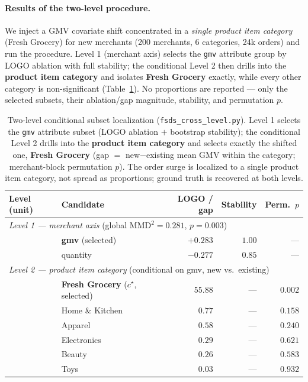 \documentclass[11pt]{article}
\newcommand{\MMD}{\mathrm{MMD}}
\begin{document}
\paragraph{Results of the two-level procedure.} We inject a GMV covariate shift
concentrated in a \emph{single product item category} (Fresh Grocery) for new
merchants (200 merchants, 6 categories, 24k orders) and run the procedure.
Level 1 (merchant axis) selects the \texttt{gmv} attribute group by LOGO ablation
with full stability; the conditional Level 2 then drills into the
\textbf{product item category} and isolates \textbf{Fresh Grocery} exactly, while
every other category is non-significant (Table~\ref{tab:twolevel}). No
proportions are reported --- only the selected subsets, their ablation/gap
magnitude, stability, and permutation $p$.

\begin{table}[t]
\centering
\begin{tabular}{llrrr}
\toprule
Level (unit) & Candidate & LOGO / gap & Stability & Perm.\ $p$ \\
\midrule
\multicolumn{5}{l}{\emph{Level 1 --- merchant axis} \;(global $\MMD^2=0.281$, $p=0.003$)}\\
\;\; & \textbf{gmv} \;(selected) & $+0.283$ & $1.00$ & --- \\
\;\; & quantity & $-0.277$ & $0.85$ & --- \\
\midrule
\multicolumn{5}{l}{\emph{Level 2 --- product item category} \;(conditional on gmv, new vs.\ existing)}\\
\;\; & \textbf{Fresh Grocery} \;($c^\star$, selected) & $\mathbf{55.88}$ & --- & $\mathbf{0.002}$ \\
\;\; & Home \& Kitchen & $0.77$ & --- & $0.158$ \\
\;\; & Apparel & $0.58$ & --- & $0.240$ \\
\;\; & Electronics & $0.29$ & --- & $0.621$ \\
\;\; & Beauty & $0.26$ & --- & $0.583$ \\
\;\; & Toys & $0.03$ & --- & $0.932$ \\
\bottomrule
\end{tabular}
\caption{Two-level conditional subset localization (\texttt{fsds\_cross\_level.py}).
Level 1 selects the \texttt{gmv} attribute subset (LOGO ablation $+$ bootstrap
stability); the conditional Level 2 drills into the \textbf{product item
category} and selects exactly the shifted one, \textbf{Fresh Grocery}
(gap $=$ new$-$existing mean GMV within the category; merchant-block permutation
$p$). The order surge is localized to a single product item category, not spread
as proportions; ground truth is recovered at both levels.}
\label{tab:twolevel}
\end{table}
\end{document}
